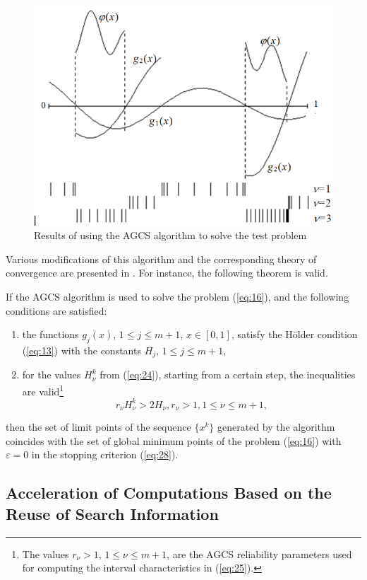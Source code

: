 \documentclass[smallextended]{svjour3}       %
\begin{document}
\begin{figure}
  \centering
  \includegraphics[width=0.6\linewidth]{fig2}
  \caption{Results of using the AGCS algorithm to solve the test problem}
  \label{fig:2}
\end{figure}

Various modifications of this algorithm and the corresponding theory of convergence are presented in \cite{c18}. For instance, the following theorem is valid.

\begin{theorem}
If the AGCS algorithm is used to solve the problem (\ref{eq:16}), and the following conditions are satisfied:
\begin{enumerate}
	\item the functions $g_j(x)$, $1 \leq j \leq m+1$, $x\in[0,1]$, satisfy the H\"older condition (\ref{eq:13}) with the constants $H_j$, $1 \leq j \leq m+1$,
	\item for the values $H^k_\nu$ from (\ref{eq:24}), starting from a certain step, the inequalities are valid\footnote{The values $r_{\nu} > 1$, $1 \leq \nu \leq m+1$, are the AGCS reliability parameters used for computing the interval characteristics in (\ref{eq:25}).}
\begin{equation} \label{eq:29}
r_\nu H^k_\nu > 2H_\nu, r_\nu > 1, 1 \leq \nu \leq m+1,
\end{equation}
\end{enumerate}
then the set of limit points of the sequence $\{x^k\}$ generated by the algorithm coincides with the set of global minimum points of the problem (\ref{eq:16}) with $\varepsilon=0$ in the stopping criterion (\ref{eq:28}).
\end{theorem}

\subsection{Acceleration of Computations Based on the Reuse of Search Information}
\end{document}
